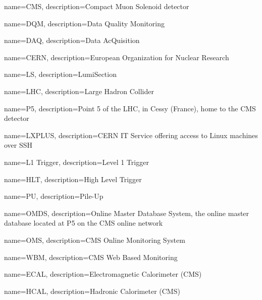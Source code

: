 {
    name=CMS,
    description={Compact Muon Solenoid detector}
}

{
    name=DQM,
    description={Data Quality Monitoring}
}

{
    name=DAQ,
    description={Data AcQuisition}
}

{
    name=CERN,
    description={European Organization for Nuclear Research}
}

{
    name=LS,
    description={LumiSection}
}

{
    name=LHC,
    description={Large Hadron Collider}
}


{
    name=P5,
    description={Point 5 of the LHC, in Cessy (France), home to the CMS detector}
}

{
    name=LXPLUS,
    description={CERN IT Service offering access to Linux machines over SSH}
}

{
    name=L1 Trigger,
    description={Level 1 Trigger}
}

{
    name=HLT,
    description={High Level Trigger}
}

{
    name=PU,
    description={Pile-Up}
}

{
    name=OMDS,
    description={Online Master Database System, the online master database located at P5 on the CMS online network}
}

{
    name=OMS,
    description={CMS Online Monitoring System}
}

{
    name=WBM,
    description={CMS Web Based Monitoring}
}


{
    name=ECAL,
    description={Electromagnetic Calorimeter (CMS)}
}


{
    name=HCAL,
    description={Hadronic Calorimeter (CMS)}
}


